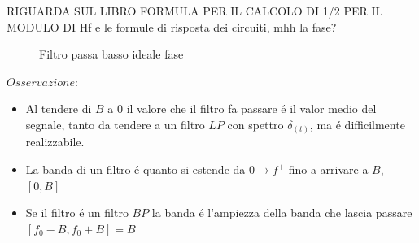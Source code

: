            RIGUARDA SUL LIBRO FORMULA PER IL CALCOLO DI 1/2 PER IL MODULO DI Hf e le formule di risposta dei circuiti, mhh la fase?
            \begin{figure}[H]
                \centering
                \caption{Filtro passa basso ideale fase}
                \label{fig:LP filter phase}
            \end{figure} 

            $Osservazione$: 
            \begin{itemize}
                \item{
                    Al tendere di $B$ a $0$ il valore che il filtro fa passare é il valor medio del segnale, tanto da tendere
                    a un filtro $LP$ con spettro $\delta_{(t)}$, ma é difficilmente realizzabile.
                }
                \item{
                    La banda di un filtro é quanto si estende da $0 \rightarrow f^+$ fino a arrivare a $B$,$[0,B]$
                }
                \item{
                    Se il filtro é un filtro $BP$ la banda é l'ampiezza della banda che lascia passare $[f_0-B,f_0+B] = B$
                }
            \end{itemize}
